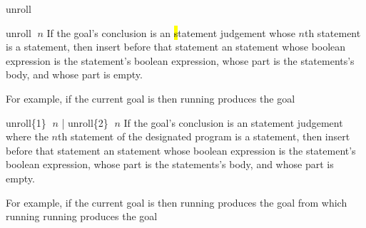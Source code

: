\begin{tactic}{unroll}
  \begin{tsyntax}{unroll $\;n$}
    If the goal's conclusion is an \hl statement judgement whose $n$th
    statement is a  statement, then insert before that
    statement an  statement whose boolean expression is the
     statement's boolean expression, whose  part is
    the  statements's body, and whose  part is
    empty.

    \medskip For example, if the current goal is
     then
    running 
    produces the goal
  \end{tsyntax}

  \begin{tsyntax}{unroll\{1\} $\;n$ | unroll\{2\} $\;n$}
    If the goal's conclusion is an \prhl statement judgement where the
    $n$th statement of the designated program is a 
    statement, then insert before that statement an  statement
    whose boolean expression is the  statement's boolean
    expression, whose  part is the  statements's
    body, and whose  part is empty.

    \medskip For example, if the current goal is
     then
    running 
    produces the goal
    from which running
    running 
    produces the goal
  \end{tsyntax}
\end{tactic}
